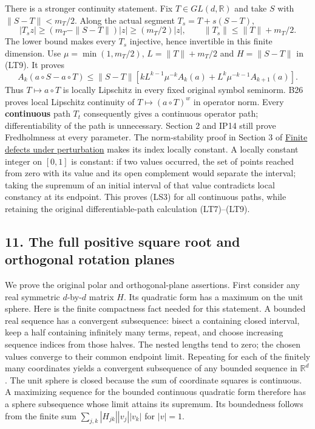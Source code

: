 \documentclass[
  11pt,
]{article}
\begin{document}
There is a stronger continuity statement. Fix \(T\in GL(d,\mathbb R)\)
and take \(S\) with \(\|S-T\|<m_T/2\). Along the actual segment
\(T_s=T+s(S-T)\), \[
 |T_sz|\ge(m_T-\|S-T\|)|z|\ge(m_T/2)|z|,
 \qquad\|T_s\|\le\|T\|+m_T/2.
 \tag{LT10}
\] The lower bound makes every \(T_s\) injective, hence invertible in
this finite dimension. Use \(\mu=\min(1,m_T/2)\), \(L=\|T\|+m_T/2\) and
\(H=\|S-T\|\) in (LT9). It proves \[
 A_k(a\circ S-a\circ T)
 \le\|S-T\|\left[kL^{k-1}\mu^{-k}A_k(a)
                 +L^k\mu^{-k-1}A_{k+1}(a)\right].
 \tag{LT11}
\] Thus \(T\mapsto a\circ T\) is locally Lipschitz in every fixed
original symbol seminorm. B26 proves local Lipschitz continuity of
\(T\mapsto(a\circ T)^w\) in operator norm. Every \textbf{continuous}
path \(T_t\) consequently gives a continuous operator path;
differentiability of the path is unnecessary. Section 2 and IP14 still
prove Fredholmness at every parameter. The norm-stability proof in
Section 3 of \href{fredholm-stability.pdf}{Finite defects under
perturbation} makes its index locally constant. A locally constant
integer on \([0,1]\) is constant: if two values occurred, the set of
points reached from zero with its value and its open complement would
separate the interval; taking the supremum of an initial interval of
that value contradicts local constancy at its endpoint. This proves
(LS3) for all continuous paths, while retaining the original
differentiable-path calculation (LT7)--(LT9).

\subsection{11. The full positive square root and orthogonal rotation
planes}\label{the-full-positive-square-root-and-orthogonal-rotation-planes}

We prove the original polar and orthogonal-plane assertions. First
consider any real symmetric \(d\)-by-\(d\) matrix \(H\). Its quadratic
form has a maximum on the unit sphere. Here is the finite compactness
fact needed for this statement. A bounded real sequence has a convergent
subsequence: bisect a containing closed interval, keep a half containing
infinitely many terms, repeat, and choose increasing sequence indices
from those halves. The nested lengths tend to zero; the chosen values
converge to their common endpoint limit. Repeating for each of the
finitely many coordinates yields a convergent subsequence of any bounded
sequence in \(\mathbb R^d\). The unit sphere is closed because the sum
of coordinate squares is continuous. A maximizing sequence for the
bounded continuous quadratic form therefore has a sphere subsequence
whose limit attains its supremum. Its boundedness follows from the
finite sum \(\sum_{j,k}|H_{jk}||v_j||v_k|\) for \(|v|=1\).
\end{document}
